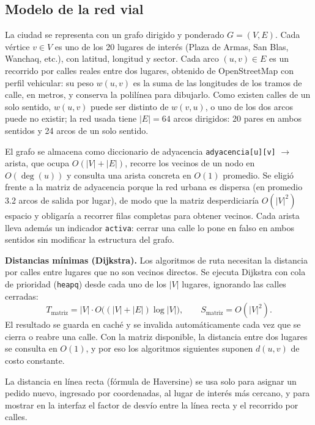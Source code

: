 \subsection{Modelo de la red vial}

La ciudad se representa con un grafo dirigido y ponderado $G=(V,E)$. Cada vértice $v\in V$ es uno de los 20 lugares de interés (Plaza de Armas, San Blas, Wanchaq, etc.), con latitud, longitud y sector. Cada arco $(u,v)\in E$ es un recorrido por calles reales entre dos lugares, obtenido de OpenStreetMap con perfil vehicular: su peso $w(u,v)$ es la suma de las longitudes de los tramos de calle, en metros, y conserva la polilínea para dibujarlo. Como existen calles de un solo sentido, $w(u,v)$ puede ser distinto de $w(v,u)$, o uno de los dos arcos puede no existir; la red usada tiene $|E|=64$ arcos dirigidos: 20 pares en ambos sentidos y 24 arcos de un solo sentido.

El grafo se almacena como diccionario de adyacencia \texttt{adyacencia[u][v]} $\to$ arista, que ocupa $O(|V|+|E|)$, recorre los vecinos de un nodo en $O(\deg(u))$ y consulta una arista concreta en $O(1)$ promedio. Se eligió frente a la matriz de adyacencia porque la red urbana es dispersa (en promedio 3.2 arcos de salida por lugar), de modo que la matriz desperdiciaría $O(|V|^2)$ espacio y obligaría a recorrer filas completas para obtener vecinos. Cada arista lleva además un indicador \texttt{activa}: cerrar una calle lo pone en falso en ambos sentidos sin modificar la estructura del grafo.

\textbf{Distancias mínimas (Dijkstra).} Los algoritmos de ruta necesitan la distancia por calles entre lugares que no son vecinos directos. Se ejecuta Dijkstra con cola de prioridad (\texttt{heapq}) desde cada uno de los $|V|$ lugares, ignorando las calles cerradas:
\begin{equation}
    T_{\text{matriz}} = |V|\cdot O\big((|V|+|E|)\log|V|\big), \qquad S_{\text{matriz}} = O(|V|^2).
\end{equation}
El resultado se guarda en caché y se invalida automáticamente cada vez que se cierra o reabre una calle. Con la matriz disponible, la distancia entre dos lugares se consulta en $O(1)$, y por eso los algoritmos siguientes suponen $d(u,v)$ de costo constante.

La distancia en línea recta (fórmula de Haversine) se usa solo para asignar un pedido nuevo, ingresado por coordenadas, al lugar de interés más cercano, y para mostrar en la interfaz el factor de desvío entre la línea recta y el recorrido por calles.


